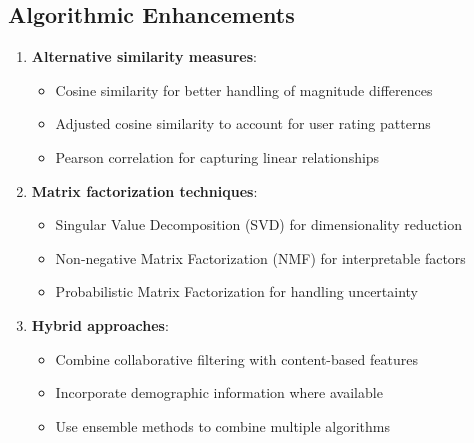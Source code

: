 \documentclass[12pt,a4paper]{article}
\begin{document}
\subsection{Algorithmic Enhancements}
\begin{enumerate}
    \item \textbf{Alternative similarity measures}: 
        \begin{itemize}
            \item Cosine similarity for better handling of magnitude differences
            \item Adjusted cosine similarity to account for user rating patterns
            \item Pearson correlation for capturing linear relationships
        \end{itemize}
    
    \item \textbf{Matrix factorization techniques}:
        \begin{itemize}
            \item Singular Value Decomposition (SVD) for dimensionality reduction
            \item Non-negative Matrix Factorization (NMF) for interpretable factors
            \item Probabilistic Matrix Factorization for handling uncertainty
        \end{itemize}
    
    \item \textbf{Hybrid approaches}:
        \begin{itemize}
            \item Combine collaborative filtering with content-based features
            \item Incorporate demographic information where available
            \item Use ensemble methods to combine multiple algorithms
        \end{itemize}
\end{enumerate}
\end{document}

